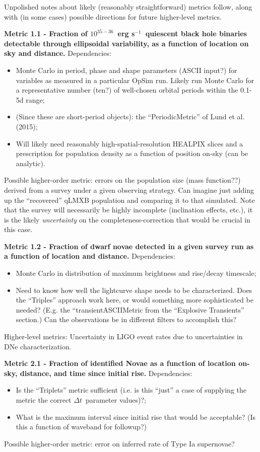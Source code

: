 Unpolished notes about likely (reasonably straightforward) metrics
follow, along with (in some cases) possible directions for future
higher-level metrics.

{\bf Metric 1.1 - Fraction of $10^{35-36}$~erg s$^{-1}$~quiescent
  black hole binaries detectable through ellipsoidal variability, as a function of location on sky and distance.}
Dependencies:
\begin{itemize}
  \item Monte Carlo in period, phase and shape parameters (ASCII input?) for variables as measured in a particular OpSim run. Likely run Monte Carlo for a representative number (ten?) of well-chosen orbital periods within the 0.1-5d range;
  \item (Since these are short-period objects): the ``PeriodicMetric'' of Lund et al. (2015);
  \item Will likely need reasonably high-spatial-resolution HEALPIX slices and a prescription for population density as a function of position on-sky (can be analytic).
\end{itemize}
Possible higher-order metric: errors on the population size (mass
function??) derived from a survey under a given observing
strategy. Can imagine just adding up the ``recovered'' qLMXB
population and comparing it to that simulated. Note that the survey
will necessarily be highly incomplete (inclination effects, etc.), it
is the likely {\it uncertainty} on the completeness-correction that
would be crucial in this case.

{\bf Metric 1.2 - Fraction of dwarf novae detected in a given survey
  run as a function of location and distance.}
Dependencies:
\begin{itemize}
  \item Monte Carlo in distribution of maximum brightness and rise/decay timescale;
    \item Need to know how well the lightcurve shape needs to be characterized. Does the ``Triples'' approach work here, or would something more sophisticated be needed? (E.g. the ``transientASCIIMetric from the ``Explosive Transients'' section.) Can the observations be in different filters to accomplish this?
\end{itemize}
Higher-level metrics: Uncertainty in LIGO event rates due to
uncertainties in DNe characterization.

{\bf Metric 2.1 - Fraction of identified Novae as a function of location on-sky, distance, and time since initial rise.}
Dependencies:
\begin{itemize}
  \item Is the ``Triplets'' metric sufficient (i.e. is this ``just'' a case of supplying the metric the correct $\Delta t$~parameter values)?;
    \item What is the maximum interval since initial rise that would be acceptable? (Is this a function of waveband for followup?)
\end{itemize}
Possible higher-order metric: error on inferred rate of Type Ia supernovae?

